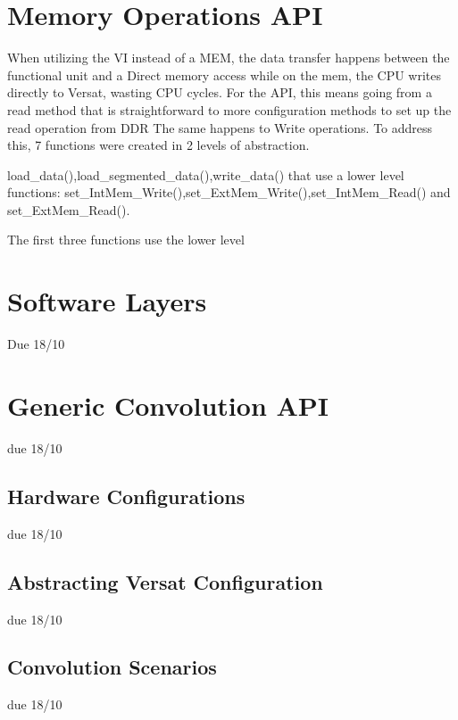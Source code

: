 \section{Memory Operations API}

When utilizing the VI instead of a MEM, the data transfer happens between the functional unit and a Direct memory access while
on the mem, the CPU writes directly to Versat, wasting CPU cycles. For the API, this means going from a read method that is straightforward
to more configuration methods to set up the read operation from DDR The same happens to Write operations. To address this, 7 functions were created in 2 levels of abstraction.


load\_data(),load\_segmented\_data(),write\_data() that use a lower level functions: set\_IntMem\_Write(),set\_ExtMem\_Write(),set\_IntMem\_Read() and set\_ExtMem\_Read().

The first three functions use the lower level 

\subsection{}


\section{Software Layers}


Due 18/10

\section{Generic Convolution API}

due 18/10

\subsection{Hardware Configurations}

due 18/10

\subsection{Abstracting Versat Configuration}

due 18/10

\subsection{Convolution Scenarios}

due 18/10




